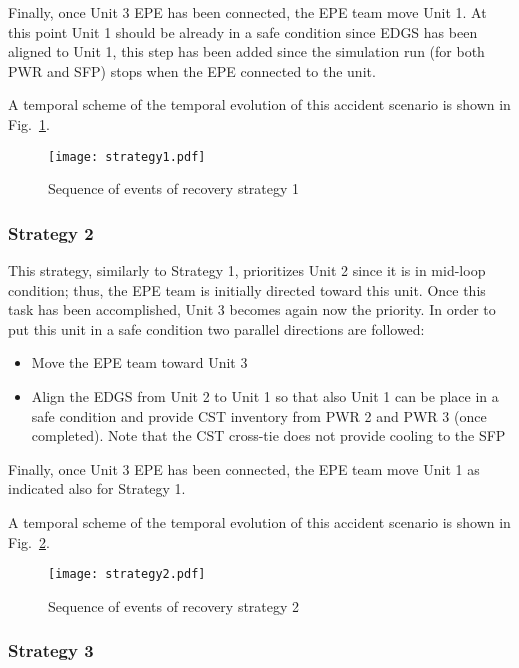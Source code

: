 Finally, once Unit 3 EPE has been connected, the EPE team move Unit 1. At this point Unit 1 should be already in a 
safe condition since EDGS has been aligned to Unit 1, this step has been added since the simulation run (for 
both PWR and SFP) stops when the EPE connected to the unit.

A temporal scheme of the temporal evolution of this accident scenario is shown in Fig.~\ref{fig:strategy1Scheme}.   

\begin{figure}
    \centering
    \centerline{\texttt{[image: strategy1.pdf]}}
    \caption{Sequence of events of recovery strategy 1}
    \label{fig:strategy1Scheme}
\end{figure}

\subsubsection{Strategy 2}
\label{sec:strategy2}

This strategy, similarly to Strategy 1, prioritizes Unit 2 since it is in mid-loop condition; thus, the EPE 
team is initially directed toward this unit. 
Once this task has been accomplished, Unit 3 becomes again now the priority. In order to put this unit in a safe 
condition two parallel directions are followed:

\begin{itemize}
  \item Move the EPE team toward Unit 3 
  \item Align the EDGS from Unit 2 to Unit 1 so that also Unit 1 can be place in a safe condition and provide 
        CST inventory from PWR 2 and PWR 3 (once completed). Note that the CST cross-tie does not provide cooling 
        to the SFP
\end{itemize}

Finally, once Unit 3 EPE has been connected, the EPE team move Unit 1 as indicated also for Strategy 1.

A temporal scheme of the temporal evolution of this accident scenario is shown in Fig.~\ref{fig:strategy2Scheme}.  

\begin{figure}
    \centering
    \centerline{\texttt{[image: strategy2.pdf]}}
    \caption{Sequence of events of recovery strategy 2}
    \label{fig:strategy2Scheme}
\end{figure}

\subsubsection{Strategy 3}
\label{sec:strategy3}

